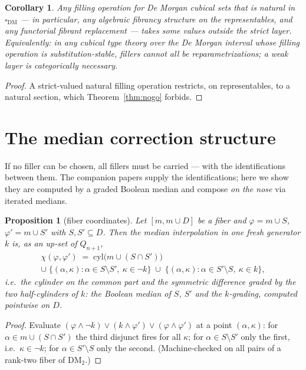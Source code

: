 \documentclass[11pt]{amsart}
\newtheorem{cor}[thm]{Corollary}
\newtheorem{prop}[thm]{Proposition}
\theoremstyle{definition}
\newcommand{\DM}{\mathrm{DM}}
\newcommand{\cube}{\square_{\mathrm{DM}}}
\newcommand{\lc}{Q}
\newcommand{\cyl}{\mathrm{cyl}}
\begin{document}
\begin{cor}
  \label{cor:weak}
  Any filling operation for De Morgan cubical sets that is natural
  in $\cube$ --- in particular, any algebraic fibrancy structure on
  the representables, and any functorial fibrant replacement ---
  takes some values outside the strict layer.  Equivalently: in any
  cubical type theory over the De Morgan interval whose filling
  operation is substitution-stable, fillers cannot all be
  reparametrizations; a weak layer is categorically necessary.
\end{cor}

\begin{proof}
  A strict-valued natural filling operation restricts, on
  representables, to a natural section, which
  Theorem~\ref{thm:nogo} forbids.
\end{proof}

\section{The median correction structure}
\label{sec:median}

If no filler can be chosen, all fillers must be carried --- with
the identifications between them.  The companion papers supply the
identifications; here we show they are computed by a graded Boolean
median and compose \emph{on the nose} via iterated medians.

\begin{prop}[fiber coordinates]
  \label{prop:coords}
  Let $[m, m \cup D]$ be a fiber and
  $\varphi = m \cup S$, $\varphi' = m \cup S'$ with
  $S, S' \subseteq D$.  Then the median interpolation in one fresh
  generator $k$ is, as an up-set of $\lc_{n+1}$,
  \begin{multline*}
    \chi(\varphi, \varphi')
    \;=\; \cyl\bigl(m \cup (S \cap S')\bigr)\\
    \cup\; \{(\alpha, \kappa) : \alpha \in S \setminus S',\
    \kappa \in \neg k\}
    \;\cup\; \{(\alpha, \kappa) : \alpha \in S' \setminus S,\
    \kappa \in k\},
  \end{multline*}
  i.e.\ the cylinder on the common part and the symmetric
  difference graded by the two half-cylinders of $k$: the Boolean
  median of $S$, $S'$ and the $k$-grading, computed pointwise on
  $D$.
\end{prop}

\begin{proof}
  Evaluate
  $(\varphi \wedge \neg k) \vee (k \wedge \varphi') \vee
  (\varphi \wedge \varphi')$ at a point $(\alpha, \kappa)$: for
  $\alpha \in m \cup (S \cap S')$ the third disjunct fires for all
  $\kappa$; for $\alpha \in S \setminus S'$ only the first, i.e.\
  $\kappa \in \neg k$; for $\alpha \in S' \setminus S$ only the
  second.  (Machine-checked on all pairs of a rank-two fiber of
  $\DM_2$.)
\end{proof}
\end{document}
